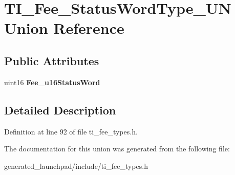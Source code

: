 \hypertarget{unionTI__Fee__StatusWordType__UN}{}\section{T\+I\+\_\+\+Fee\+\_\+\+Status\+Word\+Type\+\_\+\+UN Union Reference}
\label{unionTI__Fee__StatusWordType__UN}
\subsection*{Public Attributes}
\begin{DoxyCompactItemize}
\item 
\mbox{\label{unionTI__Fee__StatusWordType__UN_af11d76c7f2bee65c99f96d2fb466976d}} 
uint16 {\bfseries Fee\+\_\+u16\+Status\+Word}
\end{DoxyCompactItemize}


\subsection{Detailed Description}


Definition at line 92 of file ti\+\_\+fee\+\_\+types.\+h.



The documentation for this union was generated from the following file\+:\begin{DoxyCompactItemize}
\item 
generated\+\_\+launchpad/include/ti\+\_\+fee\+\_\+types.\+h\end{DoxyCompactItemize}
